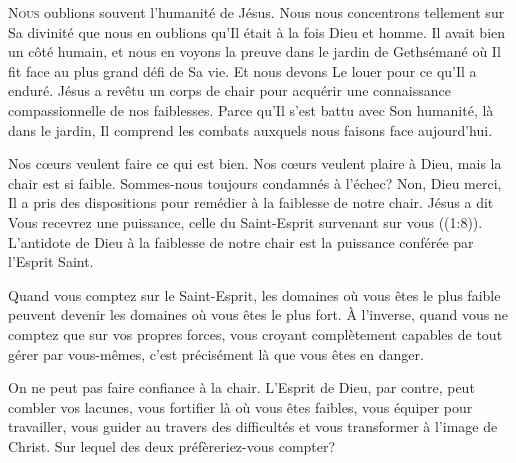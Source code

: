 \dvrule






\lettrine{N}{ous} oublions souvent l'humanité de Jésus.
 Nous nous concentrons tellement sur Sa divinité que nous en oublions
 qu'Il était à la fois Dieu et homme. Il avait bien un côté humain,
 et nous en voyons la preuve dans le jardin de Gethsémané
 \ocadr où Il fit face au plus grand défi de Sa vie.
 Et nous devons Le  louer pour ce qu'Il a enduré.
 Jésus a revêtu un corps de chair pour acquérir une connaissance
 compassionnelle de nos faiblesses. Parce qu'Il s'est battu avec Son humanité,
 là dans le jardin, Il comprend les combats auxquels nous faisons
 face aujourd'hui.

Nos c\oe{}urs veulent faire ce qui est bien.
 Nos c\oe{}urs veulent plaire à Dieu, mais la chair est si faible.
 Sommes-nous toujours condamnés à l'échec? Non, Dieu merci,
 Il a pris des dispositions pour remédier à la faiblesse de notre chair.
 Jésus a dit\frcolon{} 
 \Og Vous recevrez une puissance, celle du Saint-Esprit survenant sur vous \Fg{}
 ((1:8)).
 L'antidote de Dieu à la faiblesse de notre chair
 est la puissance conférée par l'Esprit Saint.


Quand vous comptez sur le Saint-Esprit, les domaines où vous êtes
 le plus faible peuvent devenir les domaines où vous êtes le plus fort.
 À l'inverse, quand vous ne comptez que sur vos propres forces,
 vous croyant complètement capables de tout gérer par vous-mêmes,
 c'est précisément là que vous êtes en danger.

On ne peut pas faire confiance à la chair.
 L'Esprit de Dieu, par contre, peut combler vos lacunes,
 vous fortifier là où vous êtes faibles, vous équiper pour travailler,
 vous guider au travers des difficultés et vous transformer
 à l'image de Christ. Sur lequel des deux préfèreriez-vous compter?


